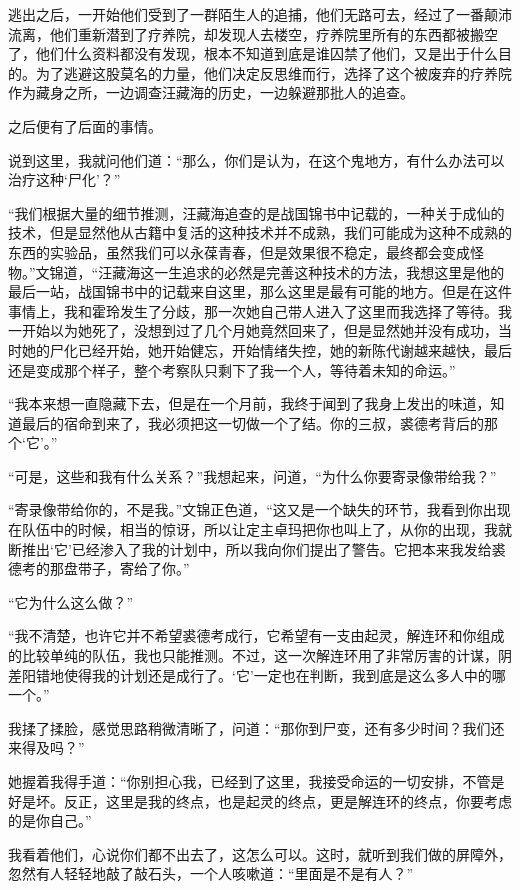 逃出之后，一开始他们受到了一群陌生人的追捕，他们无路可去，经过了一番颠沛流离，他们重新潜到了疗养院，却发现人去楼空，疗养院里所有的东西都被搬空了，他们什么资料都没有发现，根本不知道到底是谁囚禁了他们，又是出于什么目的。为了逃避这股莫名的力量，他们决定反思维而行，选择了这个被废弃的疗养院作为藏身之所，一边调查汪藏海的历史，一边躲避那批人的追查。

之后便有了后面的事情。

说到这里，我就问他们道：“那么，你们是认为，在这个鬼地方，有什么办法可以治疗这种‘尸化’？”

“我们根据大量的细节推测，汪藏海追查的是战国锦书中记载的，一种关于成仙的技术，但是显然他从古籍中复活的这种技术并不成熟，我们可能成为这种不成熟的东西的实验品，虽然我们可以永葆青春，但是效果很不稳定，最终都会变成怪物。”文锦道，“汪藏海这一生追求的必然是完善这种技术的方法，我想这里是他的最后一站，战国锦书中的记载来自这里，那么这里是最有可能的地方。但是在这件事情上，我和霍玲发生了分歧，那一次她自己带人进入了这里而我选择了等待。我一开始以为她死了，没想到过了几个月她竟然回来了，但是显然她并没有成功，当时她的尸化已经开始，她开始健忘，开始情绪失控，她的新陈代谢越来越快，最后还是变成那个样子，整个考察队只剩下了我一个人，等待着未知的命运。”

“我本来想一直隐藏下去，但是在一个月前，我终于闻到了我身上发出的味道，知道最后的宿命到来了，我必须把这一切做一个了结。你的三叔，裘德考背后的那个‘它’。”

“可是，这些和我有什么关系？”我想起来，问道，“为什么你要寄录像带给我？”

“寄录像带给你的，不是我。”文锦正色道，“这又是一个缺失的环节，我看到你出现在队伍中的时候，相当的惊讶，所以让定主卓玛把你也叫上了，从你的出现，我就断推出‘它’已经渗入了我的计划中，所以我向你们提出了警告。它把本来我发给裘德考的那盘带子，寄给了你。”

“它为什么这么做？”

“我不清楚，也许它并不希望裘德考成行，它希望有一支由起灵，解连环和你组成的比较单纯的队伍，我也只能推测。不过，这一次解连环用了非常厉害的计谋，阴差阳错地使得我的计划还是成行了。‘它’一定也在判断，我到底是这么多人中的哪一个。”

我揉了揉脸，感觉思路稍微清晰了，问道：“那你到尸变，还有多少时间？我们还来得及吗？”

她握着我得手道：“你别担心我，已经到了这里，我接受命运的一切安排，不管是好是坏。反正，这里是我的终点，也是起灵的终点，更是解连环的终点，你要考虑的是你自己。”

我看着他们，心说你们都不出去了，这怎么可以。这时，就听到我们做的屏障外，忽然有人轻轻地敲了敲石头，一个人咳嗽道：“里面是不是有人？”

